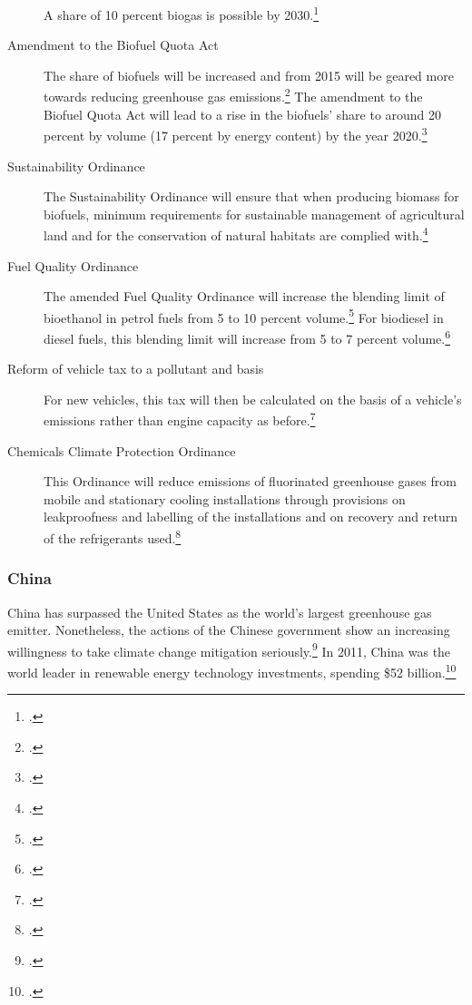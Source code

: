 \begin{description}
	A share of 10 percent biogas is possible by 2030.\footcite[][]{BMUprogramme}
	\item[Amendment to the Biofuel Quota Act] The share of biofuels will be increased and from 2015 will be geared more towards reducing greenhouse gas emissions.\footcite[][]{BMUprogramme}
	The amendment to the Biofuel Quota Act will lead to a rise in the biofuels’ share to around 20 percent by volume (17 percent by energy content) by the year 2020.\footcite[][]{BMUprogramme}
	\item[Sustainability Ordinance] The Sustainability Ordinance will ensure that when producing biomass for biofuels, minimum requirements for sustainable management of agricultural land and for the conservation of natural habitats are complied with.\footcite[][]{BMUprogramme}
	\item[Fuel Quality Ordinance] The amended Fuel Quality Ordinance will increase the blending limit of bioethanol in petrol fuels from 5 to 10 percent volume.\footcite[][]{BMUprogramme}
	For biodiesel in diesel fuels, this blending limit will increase from 5 to 7 percent volume.\footcite[][]{BMUprogramme}
	\item[Reform of vehicle tax to a pollutant and \ce{CO2} basis] For new vehicles, this tax will then be calculated on the basis of a vehicle's emissions rather than engine capacity as before.\footcite[][]{BMUprogramme}
	\item[Chemicals Climate Protection Ordinance] This Ordinance will reduce emissions of fluorinated greenhouse gases from mobile and stationary cooling installations through provisions on leakproofness and labelling of the installations and on recovery and return of the refrigerants used.\footcite[][]{BMUprogramme}
\end{description}



	\subsubsection{China}
	
	

China has surpassed the United States as the world’s largest greenhouse gas emitter.
Nonetheless, the actions of the Chinese government show an increasing willingness to take climate change mitigation seriously.\footcite[][]{ChinaTopEmission}
In 2011, China was the world leader in renewable energy technology investments, spending \$52 billion.\footcite[][]{RenewableInvestment}



